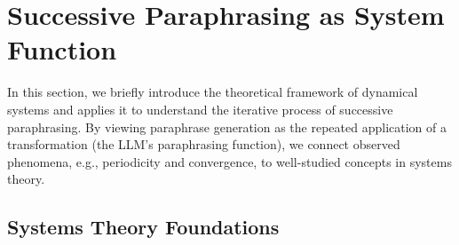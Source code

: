 \section{Successive Paraphrasing as System Function}





In this section, we briefly introduce the theoretical framework of dynamical systems and applies it to understand the iterative process of successive paraphrasing. 
By viewing paraphrase generation as the repeated application of a transformation (the LLM’s paraphrasing function), we connect observed phenomena, e.g., periodicity and convergence, to well-studied concepts in systems theory. 

\subsection{Systems Theory Foundations}

